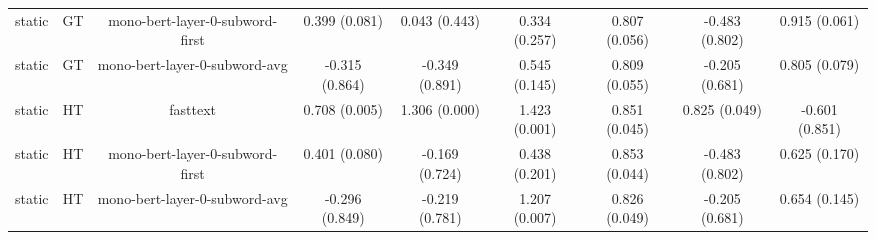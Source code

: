 \begin{sidewaystable}[htb]
\begin{tabular}{@{}ccccccccc@{}}
        static & GT & mono-bert-layer-0-subword-first & 0.399 (0.081) & 0.043 (0.443) & 0.334 (0.257) & 0.807 (0.056) & -0.483 (0.802) & 0.915 (0.061) \\
        static & GT & mono-bert-layer-0-subword-avg & -0.315 (0.864) & -0.349 (0.891) & 0.545 (0.145) & 0.809 (0.055) & -0.205 (0.681) & 0.805 (0.079) \\
        static & HT & fasttext & 0.708 (0.005) & 1.306 (0.000) & 1.423 (0.001) & 0.851 (0.045) & 0.825 (0.049) & -0.601 (0.851) \\
        static & HT & mono-bert-layer-0-subword-first & 0.401 (0.080) & -0.169 (0.724) & 0.438 (0.201) & 0.853 (0.044) & -0.483 (0.802) & 0.625 (0.170) \\
        static & HT & mono-bert-layer-0-subword-avg & -0.296 (0.849) & -0.219 (0.781) & 1.207 (0.007) & 0.826 (0.049) & -0.205 (0.681) & 0.654 (0.145) \\
        \bottomrule
    \end{tabular}
\end{sidewaystable}